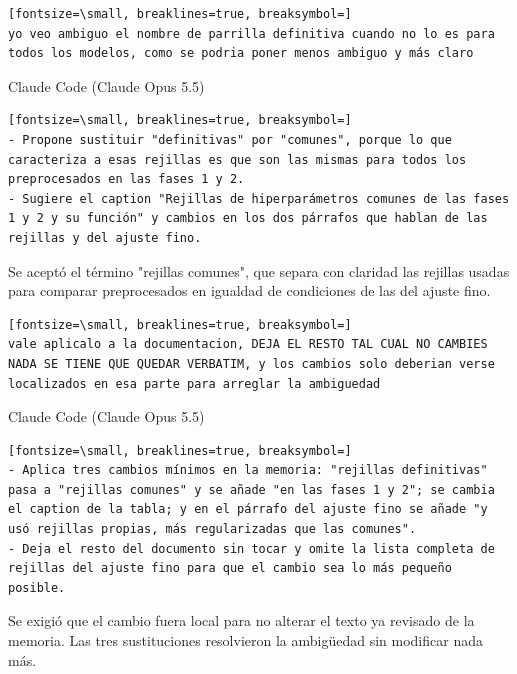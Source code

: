 \documentclass[12pt,a4paper,oneside]{book}
\begin{document}
\begin{iaprompt}
\begin{iaprompt}
\begin{Verbatim}[fontsize=\small, breaklines=true, breaksymbol=]
yo veo ambiguo el nombre de parrilla definitiva cuando no lo es para todos los modelos, como se podria poner menos ambiguo y más claro
\end{Verbatim}
\end{iaprompt}
\begin{iaresp}{Claude Code (Claude Opus 5.5)}
\begin{Verbatim}[fontsize=\small, breaklines=true, breaksymbol=]
- Propone sustituir "definitivas" por "comunes", porque lo que caracteriza a esas rejillas es que son las mismas para todos los preprocesados en las fases 1 y 2.
- Sugiere el caption "Rejillas de hiperparámetros comunes de las fases 1 y 2 y su función" y cambios en los dos párrafos que hablan de las rejillas y del ajuste fino.
\end{Verbatim}
\end{iaresp}
\begin{iaanalisis}
Se aceptó el término "rejillas comunes", que separa con claridad las rejillas usadas para comparar preprocesados en igualdad de condiciones de las del ajuste fino.
\end{iaanalisis}


\begin{iaprompt}
\begin{Verbatim}[fontsize=\small, breaklines=true, breaksymbol=]
vale aplicalo a la documentacion, DEJA EL RESTO TAL CUAL NO CAMBIES NADA SE TIENE QUE QUEDAR VERBATIM, y los cambios solo deberian verse localizados en esa parte para arreglar la ambiguedad
\end{Verbatim}
\end{iaprompt}
\begin{iaresp}{Claude Code (Claude Opus 5.5)}
\begin{Verbatim}[fontsize=\small, breaklines=true, breaksymbol=]
- Aplica tres cambios mínimos en la memoria: "rejillas definitivas" pasa a "rejillas comunes" y se añade "en las fases 1 y 2"; se cambia el caption de la tabla; y en el párrafo del ajuste fino se añade "y usó rejillas propias, más regularizadas que las comunes".
- Deja el resto del documento sin tocar y omite la lista completa de rejillas del ajuste fino para que el cambio sea lo más pequeño posible.
\end{Verbatim}
\end{iaresp}
\begin{iaanalisis}
Se exigió que el cambio fuera local para no alterar el texto ya revisado de la memoria. Las tres sustituciones resolvieron la ambigüedad sin modificar nada más.
\end{iaanalisis}



\end{iaprompt}
\end{document}
